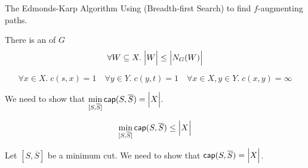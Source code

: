 \begin{frame}{}
  \begin{exampleblock}{The Edmonds-Karp Algorithm}
    Using  (Breadth-first Search) to find $f$-augmenting paths.
  \end{exampleblock}

  \vspace{0.50cm}
\end{frame}

\begin{frame}{}
  \begin{theorem}
    There is an  of $G$ 
    \[
      \forall W \subseteq X.\; \Big\lvert W \Big\rvert \le \Big\lvert N_{G}(W) \Big\rvert
    \]
  \end{theorem}

  \pause
  \[
    \forall x \in X.\; c(s, x) = 1 \quad \forall y \in Y.\; c(y, t) = 1
    \quad \forall x \in X, y \in Y.\; c(x, y) = \infty
  \]

  \pause
  \begin{center}
  \end{center}
\end{frame}

\begin{frame}{}
  \begin{center}
    We need to show that
    $\min\limits_{[S, \overline{S}]} \textsf{cap}(S, \overline{S}) = \Big\lvert X \Big\rvert.$
  \end{center}

  \pause
  \[
    \min\limits_{[S, \overline{S}]} \textsf{cap}(S, \overline{S}) \le \Big\lvert X \Big\rvert
  \]

  \pause
  \begin{center}
  \end{center}
\end{frame}

\begin{frame}{}
  \begin{center}
    Let $[S, \overline{S}]$ be a minimum cut.
    We need to show that $\textsf{cap}(S, \overline{S}) = \Big\lvert X \Big\rvert$.

    \vspace{0.30cm}

  \end{center}
\end{frame}

